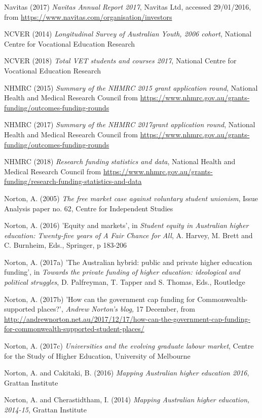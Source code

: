 \documentclass[]{book}
\begin{document}
Navitas (2017) \emph{Navitas Annual Report 2017}, Navitas Ltd, accessed 29/01/2016, from \url{https://www.navitas.com/organisation/investors}

\protect\hypertarget{_ENREF_154}{}{}NCVER (2014) \emph{Longitudinal Survey of Australian Youth, 2006 cohort}, National Centre for Vocational Education Research

NCVER (2018) \emph{Total VET students and courses 2017}, National Centre for Vocational Education Research

NHMRC (2015) \emph{Summary of the NHMRC 2015 grant application round}, National Health and Medical Research Council from \url{https://www.nhmrc.gov.au/grants-funding/outcomes-funding-rounds}

NHMRC (2017) \emph{Summary of the NHMRC 2017grant application round}, National Health and Medical Research Council from \url{https://www.nhmrc.gov.au/grants-funding/outcomes-funding-rounds}

NHMRC (2018) \emph{Research funding statistics and data}, National Health and Medical Research Council from \url{https://www.nhmrc.gov.au/grants-funding/research-funding-statistics-and-data}

Norton, A. (2005) \emph{The free market case against voluntary student unionism}, Issue Analysis paper no. 62, Centre for Independent Studies

Norton, A. (2016) 'Equity and markets', in \emph{Student equity in Australian higher education: Twenty-five years of A Fair Chance for All}, A. Harvey, M. Brett and C. Burnheim, Eds., Springer, p 183-206

Norton, A. (2017a) 'The Australian hybrid: public and private higher education funding', in \emph{Towards the private funding of higher education: ideological and political struggles}, D. Palfreyman, T. Tapper and S. Thomas, Eds., Routledge

Norton, A. (2017b) 'How can the government cap funding for Commonwealth-supported places?', \emph{Andrew Norton's blog,} 17 December, from \url{http://andrewnorton.net.au/2017/12/17/how-can-the-government-cap-funding-for-commonwealth-supported-student-places/}

Norton, A. (2017c) \emph{Universities and the evolving graduate labour market}, Centre for the Study of Higher Education, University of Melbourne

Norton, A. and Cakitaki, B. (2016) \emph{Mapping Australian higher education 2016}, Grattan Institute

Norton, A. and Cherastidtham, I. (2014) \emph{Mapping Australian higher education, 2014-15}, Grattan Institute
\end{document}
